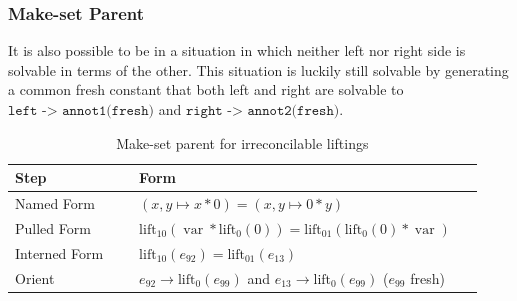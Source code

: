 \documentclass{article}%
\newcommand{\lift}{\text{lift}}
\begin{document}
\subsubsection{Make-set Parent}

It is also possible to be in a situation in which neither left nor right side is solvable in terms of the other. This situation is luckily still solvable by generating a common fresh constant that both left and right are solvable to $\texttt{left -> annot1(fresh)}$ and $\texttt{right -> annot2(fresh)}$.







\begin{table}[htbp]
\centering
\small
\renewcommand{\arraystretch}{1.4}
\begin{tabular}{p{0.25\linewidth}p{0.68\linewidth}}
\hline
Step & Form \\
\hline
Named Form
&
$(x,y \mapsto x * 0) = (x,y \mapsto 0 * y)$
\\
Pulled Form
&
$\lift_{10}(\operatorname{var} * \lift_0(0)) = \lift_{01}(\lift_0(0) * \operatorname{var})$
\\
Interned Form
&
$\lift_{10}(e_{92}) = \lift_{01}(e_{13})$
\\
Orient
&
$e_{92} \rightarrow \lift_0(e_{99})$ and $e_{13} \rightarrow \lift_0(e_{99})$ ($e_{99}$ fresh)
\\
\hline
\end{tabular}
\caption{Make-set parent for irreconcilable liftings}
\label{tab:makeset-parent}
\end{table}
\end{document}
